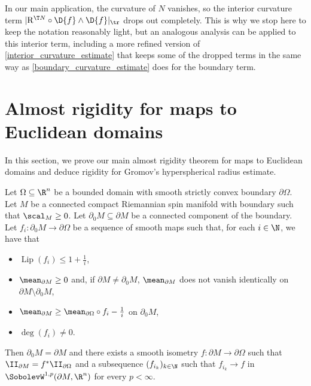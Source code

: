 \documentclass[a4paper,11pt]{amsart}
\numberwithin{equation}{section}
\begin{document}
	 In our main application, the curvature of \(N\) vanishes, so the interior curvature term \(\lvert \mathrm{R}^{\T N} \circ \D{f} \wedge \D{f} \rvert_{\tr}\) drops out completely. 
	 This is why we stop here to keep the notation reasonably light, but an analogous analysis can be applied to this interior term, including a more refined version of \cref{interior_curvature_estimate} that keeps some of the dropped terms in the same way as \cref{boundary_curvature_estimate} does for the boundary term.
 
 
 

 



\section{Almost rigidity for maps to Euclidean domains}\label{sec:almost rigidity}







In this section, we prove our main almost rigidity theorem for maps to Euclidean domains and deduce rigidity for Gromov's hyperspherical radius estimate.

\begin{proposition}\label{almost_rigidity_theorem}
    Let \(\Omega \subseteq \R^n\) be a bounded domain with smooth strictly convex boundary \(\partial \Omega\).
    Let \(M\) be a connected compact Riemannian spin manifold with boundary such that \(\scal_M \geq 0\). 
    Let \(\partial_0 M \subseteq \partial M\) be a connected component of the boundary.
    Let \(f_i \colon \partial_0 M \to \partial \Omega\) be a sequence of smooth maps such that, for each \(i \in \N\), we have that
    \begin{itemize}
        \item \(\operatorname{Lip}(f_i) \leq 1+\frac{1}{i}\),
        \item \(\mean_{\partial M} \geq 0\) and, if \(\partial M \neq \partial_0 M\), \(\mean_{\partial M}\) does not vanish identically on \(\partial M \setminus \partial_0 M\),
        \item \(\mean_{\partial M} \geq \mean_{\partial \Omega} \circ f_i - \frac{1}{i}\) on \(\partial_0 M\),
        \item \(\deg(f_i) \neq 0\).
    \end{itemize}
    Then \(\partial_0 M = \partial M\) and there exists a smooth isometry \(f \colon \partial M \to \partial \Omega\) such that \(\II_{\partial M} = f^\ast \II_{\partial \Omega}\) and a subsequence \((f_{i_k})_{k \in \N}\) such that \(f_{i_k} \to f\) in \(\SobolevW^{1,p}(\partial M, \R^n)\) for every \(p < \infty\).
 \end{proposition}
\end{document}
